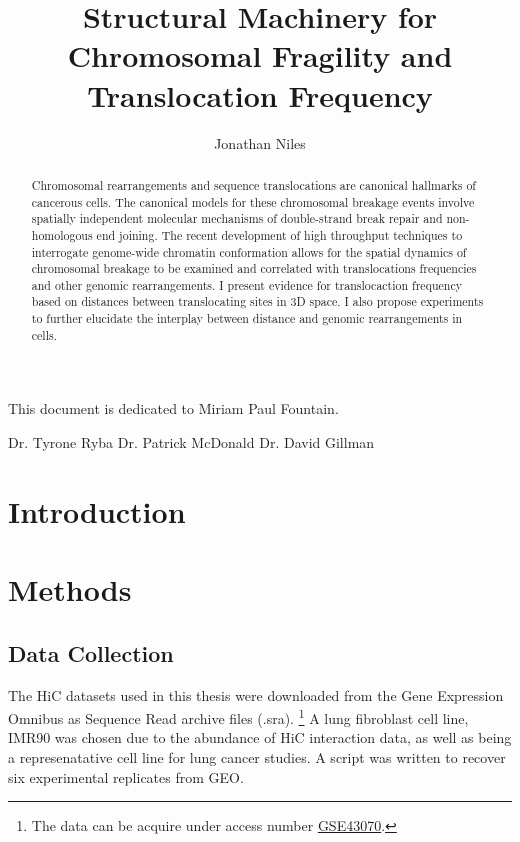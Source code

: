 \documentclass[phd,tocprelim]{cornell}
\title {Structural Machinery for Chromosomal Fragility and Translocation Frequency}
\author {Jonathan Niles}
\begin{document}
\maketitle
\makecopyright

\begin{abstract}
Chromosomal rearrangements and sequence translocations are
canonical hallmarks of cancerous cells.  The canonical models
for these chromosomal breakage events involve spatially
independent molecular mechanisms of double-strand break
repair and non-homologous end joining.  The recent development of high
throughput techniques to interrogate genome-wide chromatin
conformation allows for the spatial dynamics of chromosomal
breakage to be examined and correlated with translocations
frequencies and other genomic rearrangements.  I present
evidence for translocaction frequency based on distances between
translocating sites in 3D space.  I also propose experiments
to further elucidate the interplay between distance and
genomic rearrangements in cells.
\end{abstract}

\begin{dedication}
This document is dedicated to Miriam Paul Fountain.
\end{dedication}

\begin{acknowledgements}
Dr. Tyrone Ryba
Dr. Patrick McDonald
Dr. David Gillman
\end{acknowledgements}

\contentspage
\tablelistpage
\figurelistpage

\normalspacing \setcounter{page}{1} 
\pagestyle{cornell} \addtolength{\parskip}{0.5\baselineskip}

\chapter{Introduction}

\chapter{Methods}

\section{Data Collection}

The HiC datasets used in this thesis were downloaded from the Gene
Expression Omnibus as Sequence Read archive files (.sra).
  \footnote{
    The data can be acquire under access number
    \href{http://www.ncbi.nlm.nih.gov/geo/query/acc.cgi?acc=GSE43070}
    {GSE43070}.\cite{Ren2013}
  }
A lung fibroblast cell line, IMR90 was chosen due to the abundance of
HiC interaction data, as well as being a represenatative cell line
for lung cancer studies.  A script was written to recover six experimental
replicates from GEO.
\end{document}

